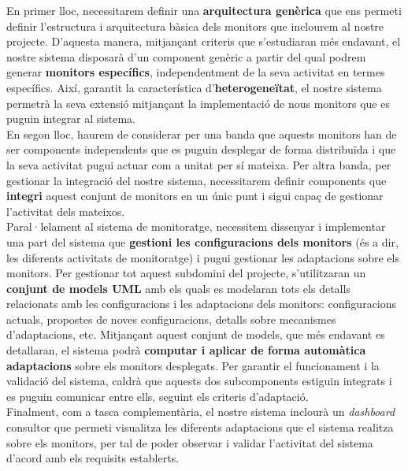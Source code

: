 En primer lloc, necessitarem definir una \textbf{arquitectura genèrica} que ens permeti definir l'estructura i arquitectura bàsica dels monitors que inclourem al nostre projecte. D'aquesta manera, mitjançant criteris que s'estudiaran més endavant, el nostre sistema disposarà d'un component genèric a partir del qual podrem generar \textbf{monitors específics}, independentment de la seva activitat en termes específics. Així, garantit la característica d'\textbf{heterogeneïtat}, el nostre sistema permetrà la seva extensió mitjançant la implementació de nous monitors que es puguin integrar al sistema.\\

En segon lloc, haurem de considerar per una banda que aquests monitors han de ser components independents que es puguin desplegar de forma distribuïda i que la seva activitat pugui actuar com a unitat per sí mateixa. Per altra banda, per gestionar la integració del nostre sistema, necessitarem definir components que \textbf{integri} aquest conjunt de monitors en un únic punt i sigui capaç de gestionar l'activitat dels mateixos.\\

Paral·lelament al sistema de monitoratge, necessitem dissenyar i implementar una part del sistema que \textbf{gestioni les configuracions dels monitors} (és a dir, les diferents activitats de monitoratge) i pugui gestionar les adaptacions sobre els monitors. Per gestionar tot aquest subdomini del projecte, s'utilitzaran un \textbf{conjunt de models UML} amb els quals es modelaran tots els detalls relacionats amb les configuracions i les adaptacions dels monitors: configuracions actuals, propostes de noves configuracions, detalls sobre mecanismes d'adaptacions, etc. Mitjançant aquest conjunt de models, que més endavant es detallaran, el sistema podrà \textbf{computar i aplicar de forma automàtica adaptacions} sobre els monitors desplegats. Per garantir el funcionament i la validació del sistema, caldrà que aquests dos subcomponents estiguin integrats i es puguin comunicar entre ells, seguint els criteris d'adaptació.\\

Finalment, com a tasca complementària, el nostre sistema inclourà un \textit{dashboard} consultor que permeti visualitza les diferents adaptacions que el sistema realitza sobre els monitors, per tal de poder observar i validar l'activitat del sistema d'acord amb els requisits establerts.

